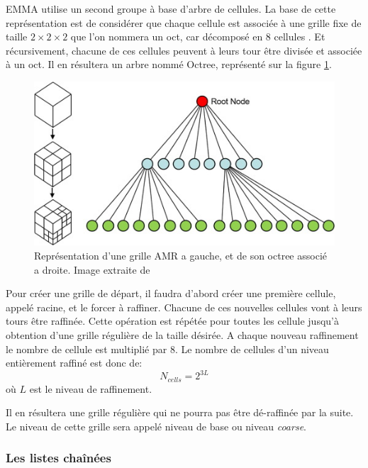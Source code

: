 EMMA utilise un second groupe à base d'arbre de cellules. %
La base de cette représentation est de considérer que chaque cellule est associée à une grille fixe de taille $2 \times 2 \times 2$ que l'on nommera un oct, car décomposé en 8 cellules \citep{khokhlov_fully_1998-1}.
Et récursivement, chacune de ces cellules peuvent à leurs tour être divisée et associée à un oct.
Il en résultera un arbre nommé Octree, représenté sur la figure \ref{fig:octree}.

\begin{figure}
        \includegraphics[width=.95\linewidth]{img/02/octree.jpg} 
        \caption[Grille AMR et son octree]{Représentation d'une grille AMR a gauche, et de son octree associé a droite. 
        Image extraite de \cite{SU201659}
     	\label{fig:octree}
}
\end{figure}

Pour créer une grille de départ, il faudra d'abord créer une première cellule, appelé racine, et le forcer à raffiner.
Chacune de ces nouvelles cellules vont à leurs tours être raffinée.
Cette opération est répétée pour toutes les cellule jusqu'à obtention d'une grille régulière de la taille désirée.
A chaque nouveau raffinement le nombre de cellule est multiplié par 8.
Le nombre de cellules d'un niveau entièrement raffiné est donc de:
\begin{equation}
N_{cells} = 2^{3L}
\end{equation}
où $L$ est le niveau de raffinement.

Il en résultera une grille régulière qui ne pourra pas être dé-raffinée par la suite.
Le niveau de cette grille sera appelé niveau de base ou niveau \textit{coarse}.

\subsubsection{Les listes chaînées}

